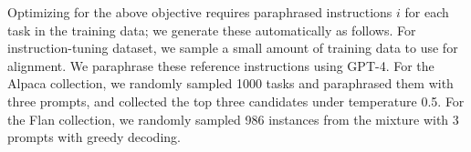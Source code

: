 \begin{comment}
\begin{table}%
  \small
  \centering
  \begin{tabular}{c l c c c }
    \toprule
    \textbf{Collection} & \textbf{Task}                    & \textbf{Type} & \textbf{Instances} & \textbf{\# of Paraphrases} \\
    \midrule
    \textbf{NIV2}       & \textsc{CommonsenseQA}           & QA            & 120                & 14                         \\
    \textbf{NIV2}       & \textsc{AI2 ARC-Challenge}       & QA            & 120                & 14                         \\
    \textbf{NIV2}       & \textsc{OpenbookQA}              & QA            & 120                & 14                         \\
    \textbf{NIV2}       & \textsc{MathQA General}          & QA            & 120                & 14                         \\
    \textbf{NIV2}       & \textsc{XCSR MC Classification}  & MC            & 120                & 14                         \\
    \textbf{NIV2}       & \textsc{Newscomm Classification} & MC            & 120                & 14                         \\
    \textbf{NIV2}       & \textsc{TriviaQA Classification} & BC            & 120                & 14                         \\
    \textbf{NIV2}       & \textsc{MultiRC Classification}  & BC            & 120                & 14                         \\
    \hline
    \textbf{Alpaca}     & \textsc{Alpaca}                  & General       & 500                & 9                          \\
    \bottomrule
  \end{tabular}
  \vspace{-0.5em}
  \caption{Data used for soft prompt alignment; we paraphrase reference instructions using GPT-4.}
  \label{tab:data_stat}
\end{table}
\vspace{-0.5em}

\end{comment}

Optimizing for the above objective requires paraphrased instructions $i$ for each task in the training data; we generate these automatically as follows.
For instruction-tuning dataset, we sample a small amount of training data to use for alignment. %
We paraphrase these reference instructions using GPT-4. For the Alpaca collection, we randomly sampled 1000 tasks and paraphrased them with three prompts, and collected the top three candidates under temperature 0.5. For the Flan collection, we randomly sampled 986 instances from the mixture with 3 prompts with greedy decoding. %

